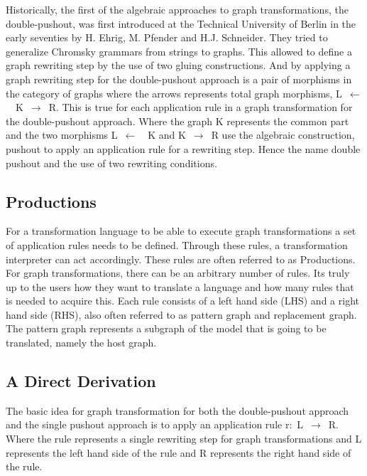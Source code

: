 \documentclass[pdftex,11pt,a4paper]{article}
\begin{document}
\indent Historically, the first of the algebraic approaches to graph
transformations, the double-pushout, was first introduced at the Technical
University of Berlin in the early seventies by H. Ehrig, M. Pfender and H.J.
Schneider\cite{INSPEC:606170}. They tried to generalize Chromsky grammars from
strings to graphs. This allowed to define a graph rewriting step by the use of
two gluing constructions. And by applying a graph rewriting step for the
double-pushout approach is a pair of morphisms in the category of graphs where
the arrows represents total graph morphisms, \linebreak\mbox{L $\longleftarrow$
\ K $\longrightarrow$ R}. This is true for each application rule in a graph
transformation for the double-pushout approach. Where the graph K represents the
common part and the two morphisms \mbox{L $\longleftarrow$ \ K} and \mbox{K
$\longrightarrow$ R} use the algebraic construction, pushout to apply an
application rule for a rewriting step. Hence the name double pushout and the use
of two rewriting conditions.

\subsection{Productions}
\noindent For a transformation language to be able to execute graph
transformations a set of application rules needs to be defined. Through these
rules, a transformation interpreter can act accordingly. These rules are often
referred to as Productions. For graph transformations, there can be an arbitrary
number of rules. Its truly up to the users how they want to translate a
language and how many rules that is needed to acquire this. Each rule consists
of a left hand side (LHS) and a right hand side (RHS), also often referred to as
pattern graph and replacement graph. The pattern graph represents a subgraph of
the model that is going to be translated, namely the host graph.

\subsection{A Direct Derivation}
\noindent The basic idea for graph transformation for both the double-pushout
approach and the single pushout approach is to apply an application rule
\mbox{r: L $\longrightarrow$ R}. Where the rule represents a single rewriting
step for graph transformations and L represents the left hand side of the rule and R
represents the right hand side of the rule.
\end{document}
